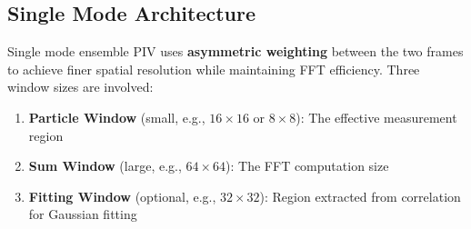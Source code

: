 \documentclass[11pt,a4paper]{article}
\begin{document}
\subsection{Single Mode Architecture}

Single mode ensemble PIV uses \textbf{asymmetric weighting} between the two frames to achieve finer spatial resolution while maintaining FFT efficiency. Three window sizes are involved:

\begin{enumerate}
    \item \textbf{Particle Window} (small, e.g., $16 \times 16$ or $8 \times 8$): The effective measurement region
    \item \textbf{Sum Window} (large, e.g., $64 \times 64$): The FFT computation size
    \item \textbf{Fitting Window} (optional, e.g., $32 \times 32$): Region extracted from correlation for Gaussian fitting
\end{enumerate}
\end{document}
